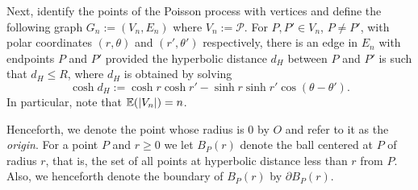 Next, identify the points of the Poisson process with vertices
and define the following graph $G_n:=(V_n,E_n)$ %
where $V_n:=\mathcal{P}$. For $P, P'\in V_n$, $P \neq P'$, with polar coordinates $(r,\theta)$ and $(r',\theta')$ respectively, there is an edge in $E_n$ with endpoints 
  $P$ and $P'$ provided the hyperbolic distance $d_H$ between $P$ and $P'$ is such that  $d_H\leq R$, where $d_H$ is obtained by solving 
\begin{equation}\label{eqn:coshLaw}
\cosh d_H := \cosh r\cosh r'-
  \sinh r\sinh r'\cos( \theta{-}\theta').
\end{equation}
In particular, note that $\mathbb{E}(|V_n|)=n$.



Henceforth, we denote the point whose radius is $0$ by $O$ and refer to it as the \emph{origin}. For a point $P$ and $r\geq 0$ we let $B_P(r)$ denote the ball centered at $P$ of radius $r$, that is, the set of all points at hyperbolic distance less than $r$ from $P$. %
Also, we henceforth denote the boundary of $B_P(r)$ by $\partial B_P(r)$.

